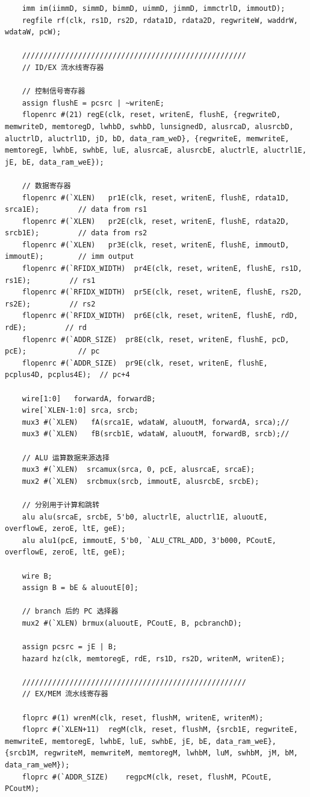 \documentclass[UTF8,a4paper,autofakebold,15pt]{ctexart}
\begin{document}
{\begin{lstlisting}
	imm im(iimmD, simmD, bimmD, uimmD, jimmD, immctrlD, immoutD);
	regfile rf(clk, rs1D, rs2D, rdata1D, rdata2D, regwriteW, waddrW, wdataW, pcW);
	
	////////////////////////////////////////////////////
	// ID/EX 流水线寄存器
	
	// 控制信号寄存器
	assign flushE = pcsrc | ~writenE;
	flopenrc #(21) regE(clk, reset, writenE, flushE, {regwriteD, memwriteD, memtoregD, lwhbD, swhbD, lunsignedD, alusrcaD, alusrcbD, aluctrlD, aluctrl1D, jD, bD, data_ram_weD}, {regwriteE, memwriteE, memtoregE, lwhbE, swhbE, luE, alusrcaE, alusrcbE, aluctrlE, aluctrl1E, jE, bE, data_ram_weE});
	
	// 数据寄存器
	flopenrc #(`XLEN) 	pr1E(clk, reset, writenE, flushE, rdata1D, srca1E);        	// data from rs1
	flopenrc #(`XLEN) 	pr2E(clk, reset, writenE, flushE, rdata2D, srcb1E);         // data from rs2
	flopenrc #(`XLEN) 	pr3E(clk, reset, writenE, flushE, immoutD, immoutE);        // imm output
	flopenrc #(`RFIDX_WIDTH)  pr4E(clk, reset, writenE, flushE, rs1D, rs1E);         // rs1
	flopenrc #(`RFIDX_WIDTH)  pr5E(clk, reset, writenE, flushE, rs2D, rs2E);         // rs2
	flopenrc #(`RFIDX_WIDTH)  pr6E(clk, reset, writenE, flushE, rdD, rdE);         // rd
	flopenrc #(`ADDR_SIZE)	pr8E(clk, reset, writenE, flushE, pcD, pcE);            // pc
	flopenrc #(`ADDR_SIZE)	pr9E(clk, reset, writenE, flushE, pcplus4D, pcplus4E);  // pc+4
	
	wire[1:0]	forwardA, forwardB;
	wire[`XLEN-1:0] srca, srcb;
	mux3 #(`XLEN)	fA(srca1E, wdataW, aluoutM, forwardA, srca);//
	mux3 #(`XLEN)	fB(srcb1E, wdataW, aluoutM, forwardB, srcb);//
	
	// ALU 运算数据来源选择
	mux3 #(`XLEN)  srcamux(srca, 0, pcE, alusrcaE, srcaE);
	mux2 #(`XLEN)  srcbmux(srcb, immoutE, alusrcbE, srcbE);
	
	// 分别用于计算和跳转
	alu alu(srcaE, srcbE, 5'b0, aluctrlE, aluctrl1E, aluoutE, overflowE, zeroE, ltE, geE);
	alu alu1(pcE, immoutE, 5'b0, `ALU_CTRL_ADD, 3'b000, PCoutE, overflowE, zeroE, ltE, geE);
	
	wire B;
	assign B = bE & aluoutE[0];
	
	// branch 后的 PC 选择器
	mux2 #(`XLEN) brmux(aluoutE, PCoutE, B, pcbranchD);	
	
	assign pcsrc = jE | B;
	hazard hz(clk, memtoregE, rdE, rs1D, rs2D, writenM, writenE);
	
	////////////////////////////////////////////////////
	// EX/MEM 流水线寄存器

	floprc #(1)	wrenM(clk, reset, flushM, writenE, writenM);
	floprc #(`XLEN+11) 	regM(clk, reset, flushM, {srcb1E, regwriteE, memwriteE, memtoregE, lwhbE, luE, swhbE, jE, bE, data_ram_weE}, {srcb1M, regwriteM, memwriteM, memtoregM, lwhbM, luM, swhbM, jM, bM, data_ram_weM});
	floprc #(`ADDR_SIZE) 	regpcM(clk, reset, flushM, PCoutE, PCoutM);
	

\end{lstlisting}}
\end{document}
